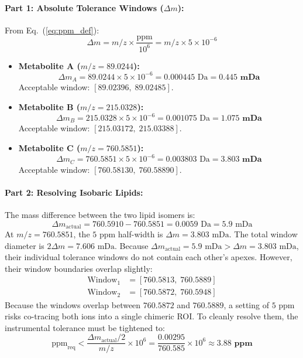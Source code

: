 \documentclass[11pt,twoside,openright]{book}
\begin{document}
\paragraph{Part 1: Absolute Tolerance Windows ($\Delta m$):}
From Eq.~(\ref{eq:ppm_def}):
\begin{equation*}
\Delta m = m/z \times \frac{\text{ppm}}{10^6} = m/z \times 5 \times 10^{-6}
\end{equation*}
\begin{itemize}
    \item \textbf{Metabolite A ($m/z = 89.0244$):}
    \begin{equation*}
    \Delta m_A = 89.0244 \times 5 \times 10^{-6} = 0.000445\text{ Da} = \mathbf{0.445\text{ mDa}}
    \end{equation*}
    Acceptable window: $[89.02396, \; 89.02485]$.
    \item \textbf{Metabolite B ($m/z = 215.0328$):}
    \begin{equation*}
    \Delta m_B = 215.0328 \times 5 \times 10^{-6} = 0.001075\text{ Da} = \mathbf{1.075\text{ mDa}}
    \end{equation*}
    Acceptable window: $[215.03172, \; 215.03388]$.
    \item \textbf{Metabolite C ($m/z = 760.5851$):}
    \begin{equation*}
    \Delta m_C = 760.5851 \times 5 \times 10^{-6} = 0.003803\text{ Da} = \mathbf{3.803\text{ mDa}}
    \end{equation*}
    Acceptable window: $[760.58130, \; 760.58890]$.
\end{itemize}

\paragraph{Part 2: Resolving Isobaric Lipids:}
The mass difference between the two lipid isomers is:
\begin{equation*}
\Delta m_{\text{actual}} = 760.5910 - 760.5851 = 0.0059\text{ Da} = 5.9\text{ mDa}
\end{equation*}
At $m/z = 760.5851$, the $5\text{ ppm}$ half-width is $\Delta m = 3.803\text{ mDa}$. The total window diameter is $2 \Delta m = 7.606\text{ mDa}$.
Because $\Delta m_{\text{actual}} = 5.9\text{ mDa} > \Delta m = 3.803\text{ mDa}$, their individual tolerance windows do not contain each other's apexes. However, their window boundaries overlap slightly:
\begin{align*}
\text{Window}_1 &= [760.5813, \; 760.5889] \\
\text{Window}_2 &= [760.5872, \; 760.5948]
\end{align*}
Because the windows overlap between $760.5872$ and $760.5889$, a setting of $5\text{ ppm}$ risks co-tracing both ions into a single chimeric ROI. To cleanly resolve them, the instrumental tolerance must be tightened to:
\begin{equation*}
\text{ppm}_{\text{req}} < \frac{\Delta m_{\text{actual}} / 2}{m/z} \times 10^6 = \frac{0.00295}{760.585} \times 10^6 \approx \mathbf{3.88\text{ ppm}}
\end{equation*}
\end{document}
